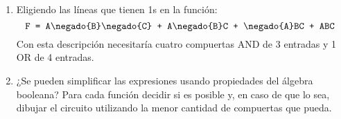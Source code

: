 \begin{enumerate}[label=\alph*)]
  \item Eligiendo las líneas que tienen 1s en la función:
        $$
          \texttt{F = A\negado{B}\negado{C} + A\negado{B}C + \negado{A}BC + ABC }
        $$
        Con esta descripción necesitaría cuatro compuertas AND de 3 entradas y 1 OR de 4 entradas.

  \item ¿Se pueden simplificar las expresiones usando propiedades del álgebra booleana?
        Para cada función decidir si es posible y, en caso de que lo sea, dibujar el circuito utilizando
        la menor cantidad de compuertas que pueda.
\end{enumerate}

